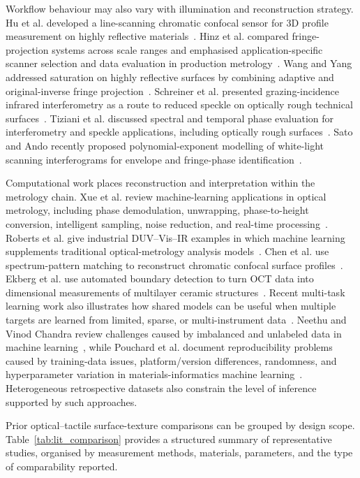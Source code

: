 \documentclass{article}
\begin{document}
Workflow behaviour may also vary with illumination and reconstruction strategy. Hu et al. developed a line-scanning chromatic confocal sensor for 3D profile measurement on highly reflective materials~\cite{Hu2021}. Hinz et al. compared fringe-projection systems across scale ranges and emphasised application-specific scanner selection and data evaluation in production metrology~\cite{Hinz2021}. Wang and Yang addressed saturation on highly reflective surfaces by combining adaptive and original-inverse fringe projection~\cite{Wang2023}. Schreiner et al. presented grazing-incidence infrared interferometry as a route to reduced speckle on optically rough technical surfaces~\cite{Schreiner1999115}. Tiziani et al. discussed spectral and temporal phase evaluation for interferometry and speckle applications, including optically rough surfaces~\cite{Tiziani1999324}. Sato and Ando recently proposed polynomial-exponent modelling of white-light scanning interferograms for envelope and fringe-phase identification~\cite{Sato2025486}.

Computational work places reconstruction and interpretation within the metrology chain. Xue et al. review machine-learning applications in optical metrology, including phase demodulation, unwrapping, phase-to-height conversion, intelligent sampling, noise reduction, and real-time processing~\cite{Xue2025}. Roberts et al. give industrial DUV--Vis--IR examples in which machine learning supplements traditional optical-metrology analysis models~\cite{Roberts2025}. Chen et al. use spectrum-pattern matching to reconstruct chromatic confocal surface profiles~\cite{Chen2021}. Ekberg et al. use automated boundary detection to turn OCT data into dimensional measurements of multilayer ceramic structures~\cite{Ekberg2014217}. Recent multi-task learning work also illustrates how shared models can be useful when multiple targets are learned from limited, sparse, or multi-instrument data~\cite{kucharski2025multitask-b68,Conrad2025}. Neethu and Vinod Chandra review challenges caused by imbalanced and unlabeled data in machine learning~\cite{Neethu2025}, while Pouchard et al. document reproducibility problems caused by training-data issues, platform/version differences, randomness, and hyperparameter variation in materials-informatics machine learning~\cite{Pouchard2020743}. Heterogeneous retrospective datasets also constrain the level of inference supported by such approaches.

Prior optical--tactile surface-texture comparisons can be grouped by design scope. Table~\ref{tab:lit_comparison} provides a structured summary of representative studies, organised by measurement methods, materials, parameters, and the type of comparability reported.
\end{document}
